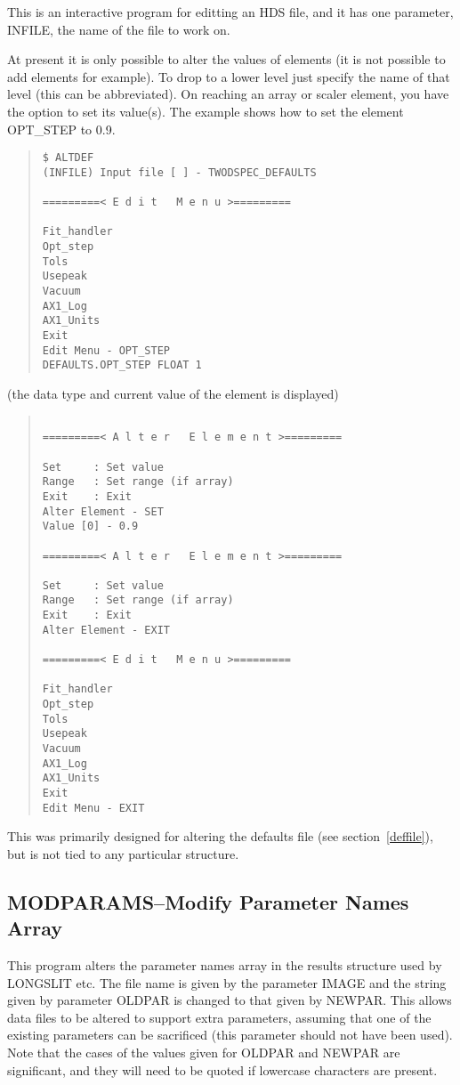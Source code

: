 This is an interactive program for editting an HDS file, and it has one
parameter, INFILE, the name of the file to work on.

At present it is only possible to alter the values of elements (it is
not possible to add elements for example).
To drop to a lower level just specify the name of that level (this can
be abbreviated).
On reaching an array or scaler element, you have the option to set its
value(s).
The example shows how to set the element OPT\_STEP to 0.9.
\begin{quote}\begin{verbatim}
$ ALTDEF 
(INFILE) Input file [ ] - TWODSPEC_DEFAULTS
 
=========< E d i t   M e n u >=========
 
Fit_handler
Opt_step
Tols
Usepeak
Vacuum
AX1_Log
AX1_Units
Exit
Edit Menu - OPT_STEP
DEFAULTS.OPT_STEP FLOAT 1
\end{verbatim}\end{quote}
(the data type and current value of the element is displayed)
\begin{quote}\begin{verbatim}
 
=========< A l t e r   E l e m e n t >=========
 
Set     : Set value
Range   : Set range (if array)
Exit    : Exit
Alter Element - SET
Value [0] - 0.9
 
=========< A l t e r   E l e m e n t >=========
 
Set     : Set value
Range   : Set range (if array)
Exit    : Exit
Alter Element - EXIT
 
=========< E d i t   M e n u >=========
 
Fit_handler
Opt_step
Tols
Usepeak
Vacuum
AX1_Log
AX1_Units
Exit
Edit Menu - EXIT
\end{verbatim}\end{quote}
This was primarily designed for altering the defaults file (see
section~\ref{deffile}), but is not tied to any particular structure.

\subsection{MODPARAMS--Modify Parameter Names Array}

This program alters the parameter names array in the results structure
used by LONGSLIT etc.
The file name is given by the parameter IMAGE and the string given by
parameter OLDPAR is changed to that given by NEWPAR.
This allows data files to be altered to support extra parameters,
assuming that one of the existing parameters can be sacrificed (this
parameter should not have been used).
Note that the cases of the values given for OLDPAR and NEWPAR are
significant, and they will need to be quoted if lowercase characters are
present.

